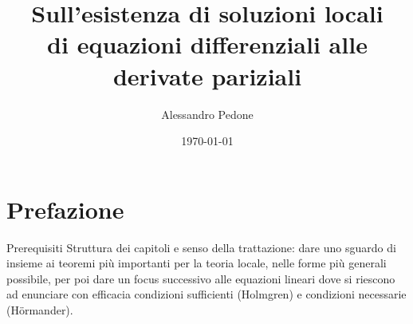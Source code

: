 \documentclass[12pt]{report}
\author{Alessandro Pedone}
\title{Sull'esistenza di soluzioni locali\\ di equazioni differenziali alle derivate pariziali}
\date{\today}
\begin{document}
\maketitle
\chapter*{Prefazione}
Prerequisiti
Struttura dei capitoli e senso della trattazione: dare uno sguardo di insieme ai teoremi più importanti per la teoria locale, nelle forme più generali possibile, per poi dare un focus successivo alle equazioni lineari dove si riescono ad enunciare con efficacia condizioni sufficienti (Holmgren) e condizioni necessarie (Hörmander).

\tableofcontents




\appendix
\end{document}
